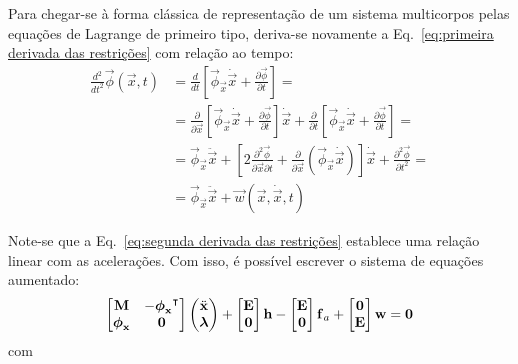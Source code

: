 Para chegar-se à forma clássica de representação de um sistema multicorpos pelas equações de Lagrange de primeiro tipo, deriva-se novamente a Eq.~\eqref{eq:primeira derivada das restrições} com relação ao tempo:
\begin{align}
 \frac{d^2}{dt^2}\vec{\phi}(\vec{x},t) &=
		\frac{d}{dt}\left[ \vec{\phi}_{\vec{x}}\dot{\vec{x}} + \frac{\partial{\vec{\phi}}}{\partial{t}}\right] = \\
		&=
		\frac{\partial}{\partial{\vec{x}}} \left[ \vec{\phi}_{\vec{x}}\dot{\vec{x}} + \frac{\partial{\vec{\phi}}}{\partial{t}}\right] \dot{\vec{x}} + 
		\frac{\partial}{\partial{t}} \left[ \vec{\phi}_{\vec{x}}\dot{\vec{x}} + \frac{\partial{\vec{\phi}}}{\partial{t}}\right] =\\
		&=
		\vec{\phi}_{\vec{x}}\ddot{\vec{x}} + \left[ 2\frac{\partial^2{\vec{\phi}}}{\partial{\vec{x}}\partial{t}} + \frac{\partial}{\partial{\vec{x}}}\left( \vec{\phi}_{\vec{x}} \dot{\vec{x}} \right) \right] \dot{\vec{x}} + \frac{\partial^2{\vec{\phi}}}{\partial{t}^2} = \\
		&=\vec{\phi}_{\vec{x}}\ddot{\vec{x}} + \vec{w}(\vec{x},\dot{\vec{x}},t) \label{eq:segunda derivada das restrições}
\end{align}

Note-se que a Eq.~\eqref{eq:segunda derivada das restrições} establece uma relação linear com as acelerações. Com isso, é possível escrever o sistema de equações aumentado:
\begin{align}
 \begin{bmatrix}
  \boldsymbol{\mathrm{M}} & -{\boldsymbol{\mathrm{\phi}}_{\boldsymbol{\mathrm{x}}}}^{\intercal} \\
  \boldsymbol{\mathrm{\phi}}_{\boldsymbol{\mathrm{x}}} & \boldsymbol{\mathrm{0}}
 \end{bmatrix} \begin{pmatrix}
                \ddot{\boldsymbol{\mathrm{x}}} \\ \boldsymbol{\mathrm{\lambda}}
               \end{pmatrix} +
 \begin{bmatrix}
  \boldsymbol{\mathrm{E}} \\ \boldsymbol{\mathrm{0}}
 \end{bmatrix} \boldsymbol{\mathrm{h}} -
 \begin{bmatrix}
  \boldsymbol{\mathrm{E}} \\ \boldsymbol{\mathrm{0}}
 \end{bmatrix} \boldsymbol{\mathrm{f}}_{a} +
 \begin{bmatrix}
  \boldsymbol{\mathrm{0}} \\ \boldsymbol{\mathrm{E}}
 \end{bmatrix} \boldsymbol{\mathrm{w}} = \boldsymbol{\mathrm{0}} \label{eq:equações aumentadas um corpo}
\end{align}
com

